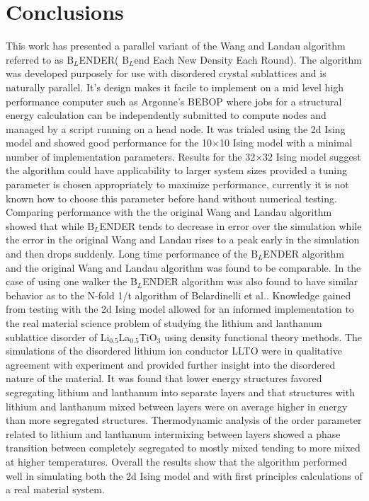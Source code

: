 \documentclass[aps,pre,reprint,superscriptaddress,showkeys]{revtex4-1}
\begin{document}
\section{Conclusions}
\label{sec4}
 This work has presented a parallel variant of the Wang and Landau algorithm referred to as B$_L$ENDER( B$_L$end Each New Density Each Round). The algorithm was developed purposely for use with disordered crystal sublattices and is naturally parallel. It's design makes it facile to implement on a mid level high performance computer such as Argonne's BEBOP where jobs for a structural energy calculation can be independently submitted to compute nodes  and managed by a script running on a head node. It was trialed using the 2d Ising model and showed good performance for the 10$\times$10 Ising model with a minimal number of implementation parameters. Results for the 32$\times$32 Ising model suggest the algorithm could have applicability to larger system sizes provided a tuning parameter is chosen appropriately to maximize performance, currently it is not known how to choose this parameter before hand without numerical testing. Comparing performance with the the original Wang and Landau algorithm showed that while B$_L$ENDER tends to decrease in error over the simulation while the error in the original Wang and Landau rises to a peak early in the simulation and then drops suddenly. Long time performance of the B$_L$ENDER algorithm and the original Wang and Landau algorithm was found to be comparable.  In the case of using one walker the B$_L$ENDER algorithm was also found to have similar behavior as to the N-fold 1/t algorithm of Belardinelli et al.\cite{saturation}. Knowledge gained from testing with the 2d Ising model allowed for an informed implementation to the real material science problem of studying the lithium and lanthanum sublattice disorder of Li$_{0.5}$La$_{0.5}$TiO$_{3}$ using density functional theory methods. The simulations of the disordered lithium ion conductor LLTO were in qualitative agreement with experiment and provided further insight into the disordered nature of the material. It was found that lower energy structures favored segregating lithium and lanthanum into separate layers and that structures with lithium and lanthanum mixed between layers were on average higher in energy than more segregated structures. Thermodynamic analysis of the order parameter related to lithium and lanthanum intermixing between layers showed a phase transition between completely segregated  to mostly mixed tending to more mixed at higher temperatures. Overall the results show that the algorithm performed well in simulating both the 2d Ising model and with first principles calculations of a real material system. 
\end{document}
